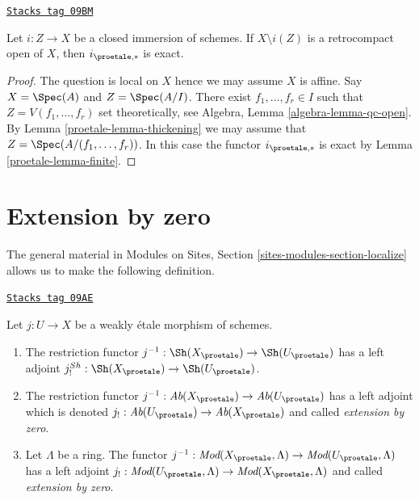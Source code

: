\begin{lemma}
\label{proetale-lemma-closed-immersion-complement-retrocompact-exact}
\href{https://stacks.math.columbia.edu/tag/09BM}{\texttt{Stacks tag 09BM}}

Let $i : Z \to X$ be a closed immersion of schemes.
If $X \setminus i(Z)$ is a retrocompact open of $X$, then
$i_{\proetale, *}$ is exact.
\end{lemma}

\begin{proof}

The question is local on $X$ hence we may assume $X$ is affine.
Say $X = \Spec(A)$ and $Z = \Spec(A/I)$. There exist
$f_1, \ldots, f_r \in I$ such that $Z = V(f_1, \ldots, f_r)$
set theoretically, see Algebra, Lemma \ref{algebra-lemma-qc-open}.
By Lemma \ref{proetale-lemma-thickening} we may assume that
$Z = \Spec(A/(f_1, \ldots, f_r))$. In this case
the functor $i_{\proetale, *}$ is exact by
Lemma \ref{proetale-lemma-finite}.
\end{proof}

\section{Extension by zero}
\label{proetale-section-extension-by-zero}
The general material in
Modules on Sites, Section \ref{sites-modules-section-localize}
allows us to make the following definition.

\begin{definition}
\label{proetale-definition-extension-zero}
\href{https://stacks.math.columbia.edu/tag/09AE}{\texttt{Stacks tag 09AE}}

Let $j : U \to X$ be a weakly \'etale morphism of schemes.
\begin{enumerate}
\item The restriction functor
$j^{-1} : \Sh(X_\proetale) \to \Sh(U_\proetale)$
has a left adjoint
$j_!^{Sh} : \Sh(X_\proetale) \to \Sh(U_\proetale)$.
\item The restriction functor
$j^{-1} : \textit{Ab}(X_\proetale) \to \textit{Ab}(U_\proetale)$
has a left adjoint which is denoted
$j_! : \textit{Ab}(U_\proetale) \to \textit{Ab}(X_\proetale)$
and called {\it extension by zero}.
\item Let $\Lambda$ be a ring. The functor
$j^{-1} : \textit{Mod}(X_\proetale, \Lambda) \to
\textit{Mod}(U_\proetale, \Lambda)$
has a left adjoint
$j_! : \textit{Mod}(U_\proetale, \Lambda) \to
\textit{Mod}(X_\proetale, \Lambda)$
and called {\it extension by zero}.
\end{enumerate}
\end{definition}

